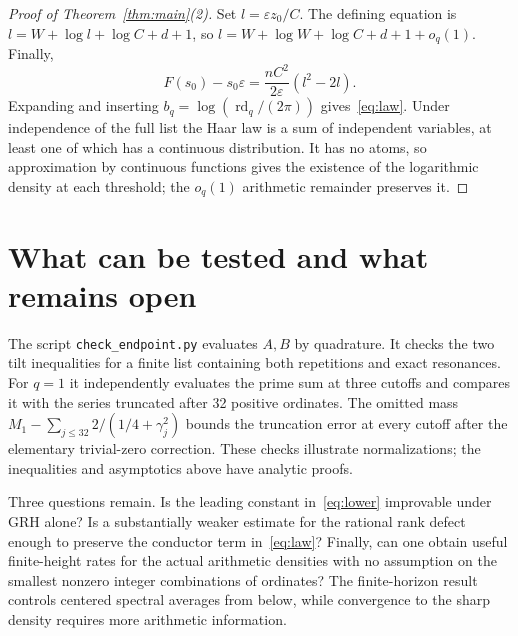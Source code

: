 \documentclass[11pt]{article}
\newcommand{\eps}{\varepsilon}\newcommand{\rd}{\operatorname{rd}}\newcommand{\EE}{\mathbb E}\newcommand{\PP}{\mathbb P}
\begin{document}
\begin{proof}[Proof of Theorem~\ref{thm:main}(2)]
Set $l=\eps z_0/C$. The defining equation is
$l=W+\log l+\log C+d+1$, so $l=W+\log W+\log C+d+1+o_q(1)$. Finally,
\[
 F(s_0)-s_0\eps=\frac{n C^2}{2\eps}(l^2-2l).
\]
Expanding and inserting $b_q=\log(\rd_q/(2\pi))$ gives~\eqref{eq:law}. Under independence of the full list the Haar law is a sum of independent variables, at least one of which has a continuous distribution. It has no atoms, so approximation by continuous functions gives the existence of the logarithmic density at each threshold; the $o_q(1)$ arithmetic remainder preserves it.
\end{proof}

\section{What can be tested and what remains open}
The script \texttt{check\_endpoint.py} evaluates $A,B$ by quadrature. It checks the two tilt inequalities for a finite list containing both repetitions and exact resonances. For $q=1$ it independently evaluates the prime sum at three cutoffs and compares it with the series truncated after 32 positive ordinates. The omitted mass $M_1-\sum_{j\le32}2/(1/4+\gamma_j^2)$ bounds the truncation error at every cutoff after the elementary trivial-zero correction. These checks illustrate normalizations; the inequalities and asymptotics above have analytic proofs.

Three questions remain. Is the leading constant in~\eqref{eq:lower} improvable under GRH alone? Is a substantially weaker estimate for the rational rank defect enough to preserve the conductor term in~\eqref{eq:law}? Finally, can one obtain useful finite-height rates for the actual arithmetic densities with no assumption on the smallest nonzero integer combinations of ordinates? The finite-horizon result controls centered spectral averages from below, while convergence to the sharp density requires more arithmetic information.
\end{document}
